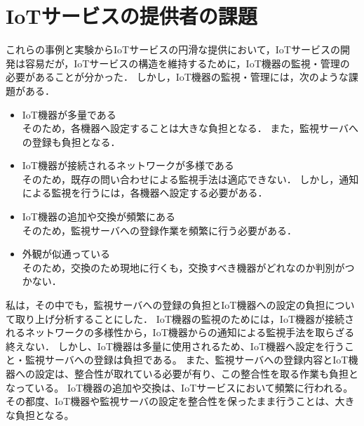 \section{IoTサービスの提供者の課題}
これらの事例と実験からIoTサービスの円滑な提供において，IoTサービスの開発は容易だが，IoTサービスの構造を維持するために，IoT機器の監視・管理の必要があることが分かった．
しかし，IoT機器の監視・管理には，次のような課題がある．
\begin{itemize}
\item IoT機器が多量である\\
	そのため，各機器へ設定することは大きな負担となる．
	また，監視サーバへの登録も負担となる．
\item IoT機器が接続されるネットワークが多様である\\
	そのため，既存の問い合わせによる監視手法は適応できない．
	しかし，通知による監視を行うには，各機器へ設定する必要がある．
\item IoT機器の追加や交換が頻繁にある\\
	そのため，監視サーバへの登録作業を頻繁に行う必要がある．
\item 外観が似通っている\\
	そのため，交換のため現地に行くも，交換すべき機器がどれなのか判別がつかない．
\end{itemize}


私は，その中でも，監視サーバへの登録の負担とIoT機器への設定の負担について取り上げ分析することにした．
IoT機器の監視のためには，IoT機器が接続されるネットワークの多様性から，IoT機器からの通知による監視手法を取らざる終えない．
しかし、IoT機器は多量に使用されるため、IoT機器へ設定を行うこと・監視サーバへの登録は負担である。
また、監視サーバへの登録内容とIoT機器への設定は、整合性が取れている必要が有り、この整合性を取る作業も負担となっている。
IoT機器の追加や交換は、IoTサービスにおいて頻繁に行われる。
その都度、IoT機器や監視サーバの設定を整合性を保ったまま行うことは、大きな負担となる。


